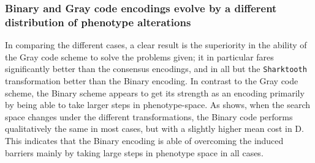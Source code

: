 \documentclass[a4paper,12pt]{article}
\theoremstyle{plain}
\theoremstyle{definition}
\begin{document}
      \subsubsection{Binary and Gray code encodings evolve by a different distribution
      of phenotype alterations}
      In comparing the different cases, a clear result is the superiority in the
      ability of the Gray code scheme to solve the problems given; it in
      particular fares significantly better than the consensus
      encodings, and in all but the \texttt{Sharktooth} transformation better
      than the Binary encoding. 
      In contrast to the Gray code scheme, the Binary scheme appears to get its strength 
      as an encoding primarily by being able to take larger steps in phenotype-space. As
       shows, when the search space changes under the
      different transformations, the Binary code performs qualitatively
      the same in most cases, but with a slightly higher mean cost in 
      D. This indicates that the
      Binary encoding is able of overcoming the induced barriers mainly by taking large
      steps in phenotype space in all cases. 
      
     
\end{document}
